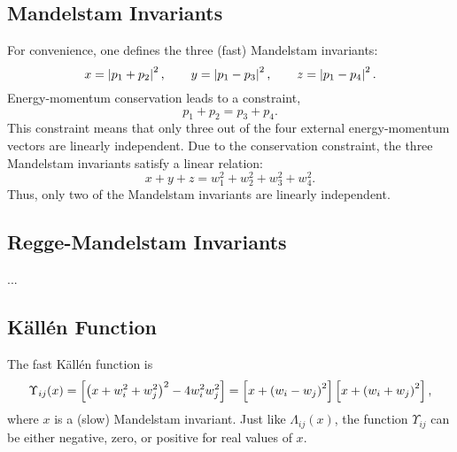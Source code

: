 \subsection{Mandelstam Invariants}
For convenience, one defines the three (fast) Mandelstam invariants:
\begin{equation}
	x = \left\lvert p_{1} + p_{2} \right\rvert^{2}, \qquad y = \left\lvert p_{1} - p_{3} \right\rvert^{2}, \qquad z = \left\lvert p_{1} - p_{4} \right\rvert^{2}. 
\end{equation}
Energy-momentum conservation leads to a constraint,
\begin{equation}
	p_{1} + p_{2} = p_{3} + p_{4}.
\end{equation}
This constraint means that only three out of the four external energy-momentum vectors are linearly independent. Due to the conservation constraint, the three Mandelstam invariants satisfy a linear relation:
\begin{equation}
	x + y + z = w_{1}^{2} + w_{2}^{2} + w_{3}^{2} + w_{4}^{2}.
	\label{eq:stu_fast}
\end{equation}
Thus, only two of the Mandelstam invariants are linearly independent.
\subsection{Regge-Mandelstam Invariants}
...
\subsection{K\"{a}ll\'{e}n Function}
The fast K\"{a}ll\'{e}n function is
\begin{equation}
	\Upsilon_{ij}(x) = \left[ \left(x + w_{i}^{2} + w_{j}^{2} \right)^{2} - 4 w_{i}^{2} w_{j}^{2} \right] = \left[ x + \left( w_{i} - w_{j} \right)^{2} \right] \left[ x + \left( w_{i} + w_{j} \right)^{2} \right],
\end{equation}
where $x$ is a (slow) Mandelstam invariant. Just like $\Lambda_{ij}(x)$, the function $\Upsilon_{ij}$ can be either negative, zero, or positive for real values of $x$.

